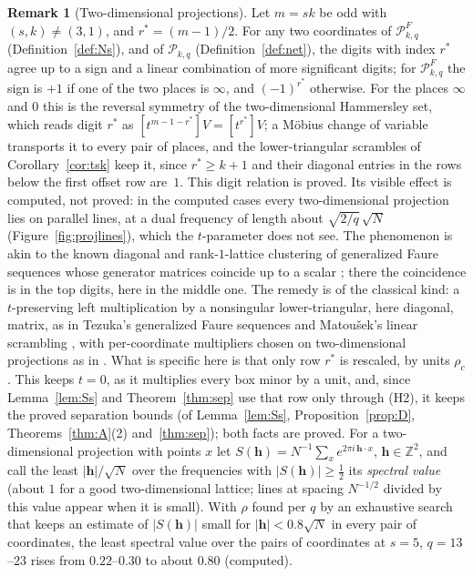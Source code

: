 \documentclass[11pt]{amsart}
\theoremstyle{definition}
\newtheorem{remark}[theorem]{Remark}
\theoremstyle{plain}
\newcommand{\Z}{\mathbb{Z}}
\begin{document}
\begin{remark}[Two-dimensional projections]\label{rem:projlines}
Let $m=sk$ be odd with $(s,k)\ne(3,1)$, and $r^*=(m-1)/2$. For any two coordinates of $\mathcal P^F_{k,q}$ (Definition~\ref{def:Ns}), and of $\mathcal P_{k,q}$ (Definition~\ref{def:net}), the digits with index $r^*$ agree up to a sign and a linear combination of more significant digits; for $\mathcal P^F_{k,q}$ the sign is $+1$ if one of the two places is $\infty$, and $(-1)^{r^*}$ otherwise. For the places $\infty$ and $0$ this is the reversal symmetry of the two-dimensional Hammersley set, which reads digit $r^*$ as $[t^{m-1-r^*}]V=[t^{r^*}]V$; a M\"obius change of variable transports it to every pair of places, and the lower-triangular scrambles of Corollary~\ref{cor:tsk} keep it, since $r^*\ge k+1$ and their diagonal entries in the rows below the first offset row are~$1$. This digit relation is proved. Its visible effect is computed, not proved: in the computed cases every two-dimensional projection lies on parallel lines, at a dual frequency of length about $\sqrt{2/q}\,\sqrt N$ (Figure~\ref{fig:projlines}), which the $t$-parameter does not see. The phenomenon is akin to the known diagonal and rank-$1$-lattice clustering of generalized Faure sequences whose generator matrices coincide up to a scalar \cite{LF09,L15}; there the coincidence is in the top digits, here in the middle one. The remedy is of the classical kind: a $t$-preserving left multiplication by a nonsingular lower-triangular, here diagonal, matrix, as in Tezuka's generalized Faure sequences \cite{Tez93,Tez95} and Matou\v{s}ek's linear scrambling \cite{Mat98}, with per-coordinate multipliers chosen on two-dimensional projections as in \cite{FL09,LF09}. What is specific here is that only row $r^*$ is rescaled, by units $\rho_c$. This keeps $t=0$, as it multiplies every box minor by a unit, and, since Lemma~\ref{lem:Ss} and Theorem~\ref{thm:sep} use that row only through (H2), it keeps the proved separation bounds (of Lemma~\ref{lem:Ss}, Proposition~\ref{prop:D}, Theorems~\ref{thm:A}(2) and~\ref{thm:sep}); both facts are proved. For a two-dimensional projection with points $x$ let $S(\mathbf h)=N^{-1}\sum_xe^{2\pi i\,\mathbf h\cdot x}$, $\mathbf h\in\Z^2$, and call the least $|\mathbf h|/\sqrt N$ over the frequencies with $|S(\mathbf h)|\ge\frac12$ its \emph{spectral value} (about $1$ for a good two-dimensional lattice; lines at spacing $N^{-1/2}$ divided by this value appear when it is small). With $\rho$ found per $q$ by an exhaustive search that keeps an estimate of $|S(\mathbf h)|$ small for $|\mathbf h|<0.8\sqrt N$ in every pair of coordinates, the least spectral value over the pairs of coordinates at $s=5$, $q=13$--$23$ rises from $0.22$--$0.30$ to about $0.80$ (computed).
\end{remark}
\end{document}
